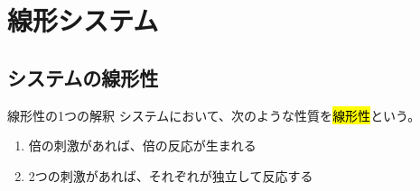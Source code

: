\documentclass[../math-imaging]{subfiles}
\begin{document}
\chapter{線形システム}

\section{システムの線形性}

\begin{definition}{線形性の1つの解釈}
  システムにおいて、次のような性質を\hl{線形性}という。
  \begin{enumerate}
    \item 倍の刺激があれば、倍の反応が生まれる
    \item 2つの刺激があれば、それぞれが独立して反応する
  \end{enumerate}
\end{definition}
\end{document}
